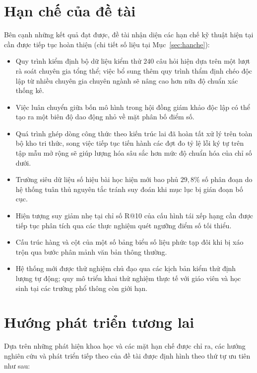 \section{Hạn chế của đề tài}
Bên cạnh những kết quả đạt được, đề tài nhận diện các hạn chế kỹ thuật hiện tại cần được tiếp tục hoàn thiện (chi tiết số liệu tại Mục~\ref{sec:hanche}):
\begin{itemize}
    \item Quy trình kiểm định bộ dữ liệu kiểm thử $240$ câu hỏi hiện dựa trên một lượt rà soát chuyên gia tổng thể; việc bổ sung thêm quy trình thẩm định chéo độc lập từ nhiều chuyên gia chuyên ngành sẽ nâng cao hơn nữa độ chuẩn xác thống kê.
    \item Việc luân chuyển giữa bốn mô hình trong hội đồng giám khảo độc lập có thể tạo ra một biên độ dao động nhỏ về mặt phân bố điểm số.
    \item Quá trình ghép dòng công thức theo kiến trúc lai đã hoàn tất xử lý trên toàn bộ kho tri thức, song việc tiếp tục tiến hành các đợt đo tỷ lệ lỗi ký tự trên tập mẫu mở rộng sẽ giúp lượng hóa sâu sắc hơn mức độ chuẩn hóa của chỉ số dưới.
    \item Trường siêu dữ liệu số hiệu bài học hiện mới bao phủ $29{,}8\%$ số phân đoạn do hệ thống tuân thủ nguyên tắc tránh suy đoán khi mục lục bị gián đoạn bố cục.
    \item Hiện tượng suy giảm nhẹ tại chỉ số R@10 của cấu hình tái xếp hạng cần được tiếp tục phân tích qua các thực nghiệm quét ngưỡng điểm số tối thiểu.
    \item Cấu trúc hàng và cột của một số bảng biểu số liệu phức tạp đôi khi bị xáo trộn qua bước phân mảnh văn bản thông thường.
    \item Hệ thống mới được thử nghiệm chủ đạo qua các kịch bản kiểm thử định lượng tự động; quy mô triển khai thử nghiệm thực tế với giáo viên và học sinh tại các trường phổ thông còn giới hạn.
\end{itemize}

\section{Hướng phát triển tương lai}
Dựa trên những phát hiện khoa học và các mặt hạn chế được chỉ ra, các hướng nghiên cứu và phát triển tiếp theo của đề tài được định hình theo thứ tự ưu tiên như sau:

